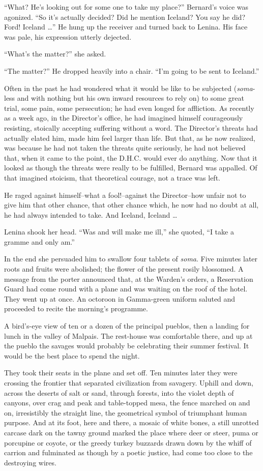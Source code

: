 \documentclass[12pt]{report}
\begin{document}
``What? He's looking out for some one to take my place?'' Bernard's
voice was agonized. ``So it's actually decided? Did he mention Iceland?
You say he did? Ford! Iceland \ldots{}'' He hung up the receiver and
turned back to Lenina. His face was pale, his expression utterly
dejected.

``What's the matter?'' she asked.

``The matter?'' He dropped heavily into a chair. ``I'm going to be sent
to Iceland.''

Often in the past he had wondered what it would be like to be subjected
(\emph{soma}-less and with nothing but his own inward resources to rely
on) to some great trial, some pain, some persecution; he had even longed
for affliction. As recently as a week ago, in the Director's office, he
had imagined himself courageously resisting, stoically accepting
suffering without a word. The Director's threats had actually elated
him, made him feel larger than life. But that, as he now realized, was
because he had not taken the threats quite seriously, he had not
believed that, when it came to the point, the D.H.C. would ever do
anything. Now that it looked as though the threats were really to be
fulfilled, Bernard was appalled. Of that imagined stoicism, that
theoretical courage, not a trace was left.

He raged against himself--what a fool!--against the Director--how unfair
not to give him that other chance, that other chance which, he now had
no doubt at all, he had always intended to take. And Iceland, Iceland
\ldots{}

Lenina shook her head. ``Was and will make me ill,'' she quoted, ``I
take a gramme and only am.''

In the end she persuaded him to swallow four tablets of \emph{soma}.
Five minutes later roots and fruits were abolished; the flower of the
present rosily blossomed. A message from the porter announced that, at
the Warden's orders, a Reservation Guard had come round with a plane and
was waiting on the roof of the hotel. They went up at once. An octoroon
in Gamma-green uniform saluted and proceeded to recite the morning's
programme.

A bird's-eye view of ten or a dozen of the principal pueblos, then a
landing for lunch in the valley of Malpais. The rest-house was
comfortable there, and up at the pueblo the savages would probably be
celebrating their summer festival. It would be the best place to spend
the night.

They took their seats in the plane and set off. Ten minutes later they
were crossing the frontier that separated civilization from savagery.
Uphill and down, across the deserts of salt or sand, through forests,
into the violet depth of canyons, over crag and peak and table-topped
mesa, the fence marched on and on, irresistibly the straight line, the
geometrical symbol of triumphant human purpose. And at its foot, here
and there, a mosaic of white bones, a still unrotted carcase dark on the
tawny ground marked the place where deer or steer, puma or porcupine or
coyote, or the greedy turkey buzzards drawn down by the whiff of carrion
and fulminated as though by a poetic justice, had come too close to the
destroying wires.
\end{document}
